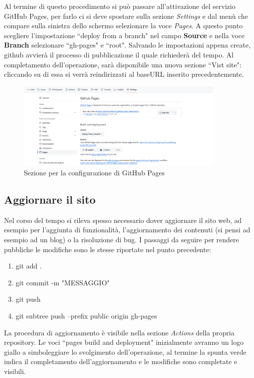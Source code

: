 \documentclass[target=bach,aauheader=]{thud}
\begin{document}
Al termine di questo procedimento si può passare all'attivazione del servizio GitHub Pages, per farlo ci si deve spostare sulla sezione \textit{Settings} e dal menù che compare sulla sinistra dello schermo selezionare la voce \textit{Pages}.
A questo punto scegliere l'impostazione ``deploy from a branch" nel campo \textbf{Source} e nella voce \textbf{Branch} selezionare ``gh-pages" e ``root".
\newline
Salvando le impostazioni appena create, github avvierà il processo di pubblicazione il quale richiederà del tempo. Al completamento dell'operazione, sarà disponibile una nuova sezione ``Vist site": 
cliccando su di essa si verrà reindirizzati al baseURL inserito precedentemente. 

\begin{figure}[b]
    \centering
    \includegraphics[width = 0.9\textwidth]{images/githubpages.png}
    \caption{Sezione per la configurazione di GitHub Pages}
\end{figure}

\subsection{Aggiornare il sito}
Nel corso del tempo si rileva spesso necessario dover aggiornare il sito web, ad esempio per l'aggiunta di funzionalità, l'aggiornamento dei contenuti (si pensi ad esempio ad un blog) o la risoluzione di bug. 
I passaggi da seguire per rendere pubbliche le modifiche sono le stesse riportate nel punto precedente:
\begin{enumerate}
    \item git add .
    \item git commit -m "MESSAGGIO"
    \item git push
    \item git subtree push --prefix public origin gh-pages
\end{enumerate}
La procedura di aggiornamento è visibile nella sezione \textit{Actions} della propria repository. Le voci ``pages build and deployment" inizialmente avranno un logo giallo a simboleggiare lo svolgimento dell'operazione, 
al termine la spunta verde indica il completamento dell'aggiornamento e le modifiche sono completate e visibili. 
\end{document}
